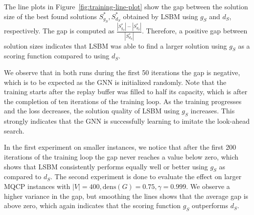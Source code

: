 \documentclass[draft,final]{vutinfth} %
\begin{document}
The line plots in Figure~\ref{fig:training-line-plot} show the gap between the solution size of the best found solutions $S^*_{g_S}, S^*_{d_S}$ obtained by LSBM using $g_S$ and $d_S$, respectively. The gap is computed as $ \frac{|S^*_{g_S}| - |S^*_{d_S}|}{|S^*_{d_S}|}$. Therefore, a positive gap between solution sizes indicates that LSBM was able to find a larger solution using $g_S$ as a scoring function compared to using $d_S$. 

We observe that in both runs during the first 50 iterations the gap is negative, which is to be expected as the GNN is initialized randomly. 
Note that the training starts after the replay buffer was filled to half its capacity, which is after the completion of ten iterations of the training loop. 
As the training progresses and the loss decreases, the solution quality of LSBM using $g_S$ increases. This strongly indicates that the GNN is successfully learning to imitate the look-ahead search. 

In the first experiment on smaller instances, we notice that after the first 200 iterations of the training loop the gap never reaches a value below zero, which shows that LSBM consistently performs equally well or better using $g_S$ as compared to $d_S$. 
The second experiment is done to evaluate the effect on larger MQCP instances with $|V|=400, \mathrm{dens}(G)=0.75, \gamma=0.999$. We observe a higher variance in the gap, but smoothing the lines shows that the average gap is above zero, which again indicates that the scoring function $g_S$ outperforms $d_S$. 
\end{document}
